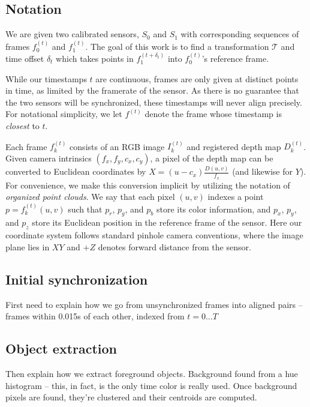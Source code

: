 \documentclass[letterpaper, 10 pt, conference]{ieeeconf}  %
\begin{document}
\subsection{Notation}

We are given two calibrated sensors, $S_0$ and $S_1$ with corresponding sequences of frames $f_0^{(t)}$ and $f_1^{(t)}$. 
The goal of this work is to find a transformation $\mathcal{T}$ and time offset $\delta_t$ which takes points in $f_1^{(t+\delta_t)}$ into $f_0^{(t)}$'s reference frame. 

While our timestamps $t$ are continuous, frames are only given at distinct points in time, as limited by the framerate of the sensor. 
As there is no guarantee that the two sensors will be synchronized, these timestamps will never align precisely. 
For notational simplicity, we let $f^{(t)}$ denote the frame whose timestamp is \emph{closest} to $t$.

Each frame $f_k^{(t)}$ consists of an RGB image $I_k^{(t)}$ and registered depth map $D_k^{(t)}$. Given camera intrinsics 
$(f_x,f_y,c_x,c_y)$, a pixel of the depth map can be converted to Euclidean coordinates by $X = (u-c_x)\frac{D(u,v)}{f_x}$ (and likewise for $Y$). 
For convenience, we make this conversion implicit by utilizing the notation of \emph{organized point clouds}.
We say that each pixel $(u,v)$ indexes a point $p = f_k^{(t)}(u,v)$ such that $p_r$, $p_g$, and $p_b$ store its color information, and $p_x$, $p_y$, and $p_z$ store its Euclidean 
position in the reference frame of the sensor. Here our coordinate system follows standard
pinhole camera conventions, where the image plane lies in $XY$ and $+Z$ denotes forward distance from the sensor.

\subsection{Initial synchronization}
First need to explain how we go from unsynchronized frames into aligned pairs -- frames within 0.015s of each other, indexed from $t = 0{\dots}T$

\subsection{Object extraction}
Then explain how we extract foreground objects. Background found from a hue histogram -- this, in fact, is the 
only time color is really used. Once background pixels are found, they're clustered and their centroids are 
computed.
\end{document}
